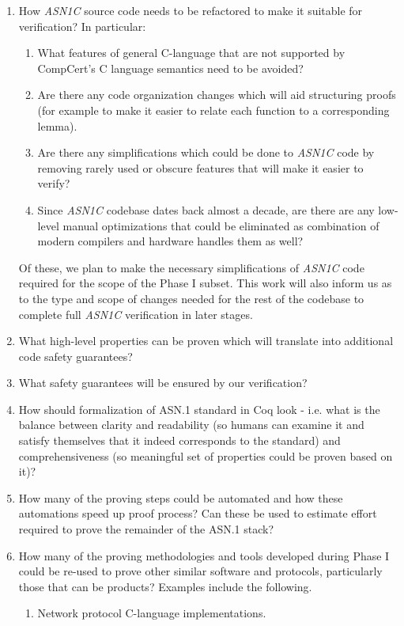 \documentclass[acmsmall,nonacm]{acmart}
\begin{document}
\begin{enumerate}
\item How \emph{ASN1C} source code needs to be refactored to make it suitable for verification? In particular:
  \begin{enumerate}
  \item What features of general C-language that are not supported by CompCert's C language semantics need to be avoided?
  \item Are there any code organization changes which will aid structuring proofs (for example to make it easier to relate each function to a corresponding lemma).
  \item Are there any simplifications which could be done to \emph{ASN1C} code by removing rarely used or obscure features that will make it easier to verify?
  \item Since \emph{ASN1C} codebase dates back almost a decade, are there are any low-level manual optimizations that could be eliminated as combination of modern compilers and hardware handles them as well?
  \end{enumerate}
  Of these, we plan to make the necessary simplifications of \emph{ASN1C}
  code required for the scope of the Phase I subset. This work will
  also inform us as to the type and scope of changes needed for the
  rest of the codebase to complete full \emph{ASN1C} verification in later
  stages.
\item What high-level properties can be proven which will translate into additional code safety guarantees?
\item What safety guarantees will be ensured by our verification?
\item How should formalization of ASN.1 standard in Coq look - i.e. what is the balance between clarity and readability (so humans can examine it and satisfy themselves that it indeed corresponds to the standard) and comprehensiveness (so meaningful set of properties could be proven based on it)?
\item How many of the proving steps could be automated and how these automations speed up proof process? Can these be used to estimate effort required to prove the remainder of the ASN.1 stack?
\item How many of the proving methodologies and tools developed during
  Phase I could be re-used to prove other similar software and
  protocols, particularly those that can be products? Examples include
  the following.
  \begin{enumerate}
    \item Network protocol C-language implementations.

\end{enumerate}
\end{enumerate}
\end{document}
